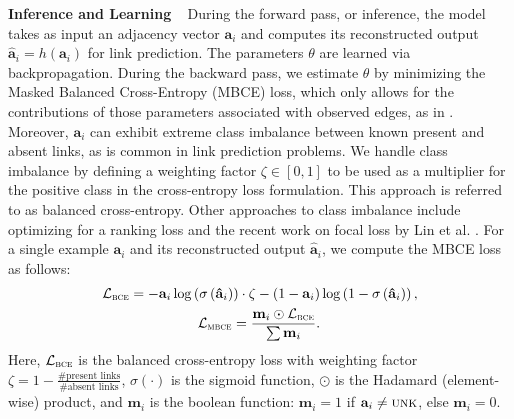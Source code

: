 \documentclass[letterpaper, conference]{IEEEtran}
\begin{document}
\noindent \textbf{Inference and Learning} ~ During the forward pass, or inference, the model takes as input an adjacency vector $\mathbf{a}_i$ and computes its reconstructed output $\mathbf{\hat{a}}_i = h(\mathbf{a}_i)$ for link prediction. The parameters $\theta$ are learned via backpropagation. During the backward pass, we estimate $\theta$ by minimizing the Masked Balanced Cross-Entropy (MBCE) loss, which only allows for the contributions of those parameters associated with observed edges, as in \cite{Sedhain:2015}. Moreover, $\mathbf{a}_i$ can exhibit extreme class imbalance between known present and absent links, as is common in link prediction problems. We handle class imbalance by defining a weighting factor $\zeta \in [0,1]$ to be used as a multiplier for the positive class in the cross-entropy loss formulation. This approach is referred to as balanced cross-entropy. Other approaches to class imbalance include optimizing for a ranking loss \cite{Menon:2011} and the recent work on focal loss by Lin et al. \cite{Lin:2017}. For a single example $\mathbf{a}_i$ and its reconstructed output $\mathbf{\hat{a}}_i$, we compute the MBCE loss as follows:
\begin{align*}
\mathcal{L}_{\textsc{bce}} = -\mathbf{a}_i \log\left(\sigma\left(\mathbf{\hat{a}}_i\right)\right) \cdot \zeta - (1 - \mathbf{a}_i) &\log\left(1 - \sigma\left(\mathbf{\hat{a}}_i\right)\right), \\
\mathcal{L}_{\textsc{mbce}} = \frac{\mathbf{m}_i \odot \mathcal{L}_{\textsc{bce}}} {\sum \mathbf{m}_i}.
\end{align*}
Here, $\mathcal{L}_{\textsc{bce}}$ is the balanced cross-entropy loss with weighting factor $\zeta = 1 - \frac{\text{\# present links}}{\text{\# absent links}}$, $\sigma(\cdot)$ is the sigmoid function, $\odot$ is the Hadamard (element-wise) product,  and $\mathbf{m}_i$ is the boolean function: $\mathbf{m}_i = 1$  if $\mathbf{a}_i \neq \textsc{unk}$, else $\mathbf{m}_i = 0$.
\end{document}
